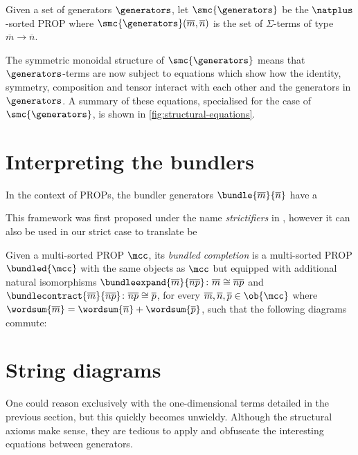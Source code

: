 \begin{definition}\label{def:freely-generated-prop}
    Given a set of generators \(\generators\), let \(\smc{\generators}\) be the
    \(\natplus\)-sorted PROP where \(
        \smc{\generators}(\overline{m}, \overline{n})
    \) is the set of \(\Sigma\)-terms of type \(\overline{m} \to \overline{n}\).
\end{definition}

The symmetric monoidal structure of \(\smc{\generators}\) means that
\(\generators\)-terms are now subject to equations which show how the identity,
symmetry, composition and tensor interact with each other and the generators in
\(\generators\).
A summary of these equations, specialised for the case of \(\smc{\generators}\),
is shown in \cref{fig:structural-equations}.



\section{Interpreting the bundlers}

In the context of PROPs, the bundler generators
\(\bundle{\overline{m}}{\overline{n}}\) have a

This framework was first proposed under the name \emph{strictifiers} in , however it can also be used in our strict case to translate be

\begin{definition}
    Given a multi-sorted PROP \(\mcc\), its \emph{bundled completion} is
    a multi-sorted PROP \(\bundled{\mcc}\) with the same objects as \(\mcc\)
    but equipped with additional natural isomorphisms \(
        \bundleexpand{\overline{m}}{\overline{np}}
        \colon \overline{m} \cong \overline{np}
    \) and \(
        \bundlecontract{\overline{m}}{\overline{np}}
        \colon \overline{np} \cong \overline{p}
    \),
    for every \(\overline{m}, \overline{n}, \overline{p} \in \ob{\mcc}\) where
    \(\wordsum{\overline{m}} = \wordsum{\overline{n}} + \wordsum{\overline{p}}\),
    such that the following diagrams commute:
\end{definition}

\section{String diagrams}

One could reason exclusively with the one-dimensional terms detailed in the
previous section, but this quickly becomes unwieldy.
Although the structural axioms make sense, they are tedious to apply and
obfuscate the interesting equations between generators.

